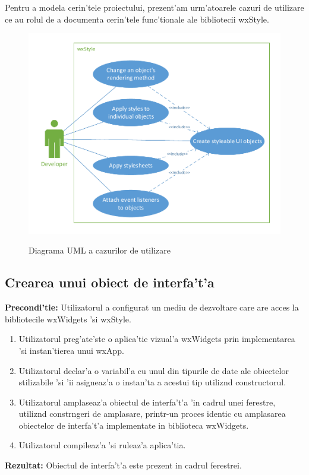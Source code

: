 Pentru a modela cerin'tele proiectului, prezent'am urm'atoarele cazuri de utilizare ce au rolul de a documenta cerin'tele func'tionale ale bibliotecii wxStyle.

\begin{figure}[H]
	\centering 
	\includegraphics{img/use_case.pdf}
	\label{fig0402}
    \caption{Diagrama UML a cazurilor de utilizare}
\end{figure}



\subsection{Crearea unui obiect de interfa't'a}
\textbf{Precondi'tie:} Utilizatorul a configurat un mediu de dezvoltare care are acces la bibliotecile wxWidgets 'si wxStyle.
\begin{enumerate}
\item Utilizatorul preg'ate'ste o aplica'tie vizual'a wxWidgets prin implementarea 'si instan'tierea unui wxApp.
\item Utilizatorul declar'a o variabil'a cu unul din tipurile de date ale obiectelor stilizabile 'si 'ii asigneaz'a o instan'ta a acestui tip utiliz{\ia}nd constructorul.
\item Utilizatorul amplaseaz'a obiectul de interfa't'a 'in cadrul unei ferestre, utiliz{\ia}nd constr{\ia}ngeri de amplasare, printr-un proces identic cu amplasarea obiectelor de interfa't'a implementate in biblioteca wxWidgets.
\item Utilizatorul compileaz'a 'si ruleaz'a aplica'tia.
\end{enumerate}
\textbf{Rezultat:} Obiectul de interfa't'a este prezent in cadrul ferestrei.

